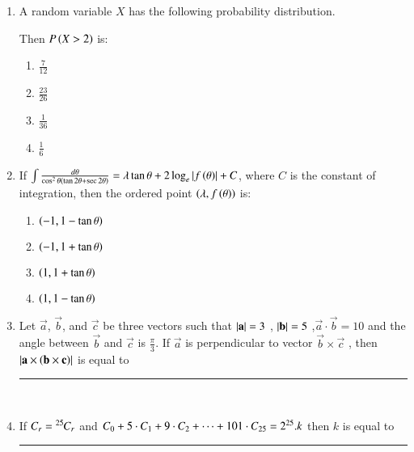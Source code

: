 \documentclass[journal]{IEEEtran}
\begin{document}
\begin{enumerate}
\item A random variable $X$ has the following probability distribution.
    \begin{table}[h!]    
        \centering
        
    \end{table}
    Then $P\left(X>2\right)$ is:
    \begin{multicols}{2}
    \begin{enumerate}
        \item $\frac{7}{12}$\\
        \item $\frac{23}{26}$
        \item $\frac{1}{36}$\\
        \item $\frac{1}{6}$\\
    \end{enumerate}
    \end{multicols}

    \item If $\int \frac{d\theta}{\cos^2 \theta (\tan 2\theta + \sec 2 \theta)} = \lambda \tan \theta + 2 \log_e \left\vert f\left(\theta\right)\right\vert  + C$, where $C$ is the constant of integration, then the ordered point $\left(\lambda, f\left(\theta\right)\right)$ is:
    \begin{multicols}{2}
    \begin{enumerate}
        \item $\left(-1, 1-\tan \theta\right)$\\
        \item $\left(-1, 1+\tan \theta\right)$\\
        \item $\left(1, 1+\tan \theta\right)$\\
        \item $\left(1, 1-\tan \theta\right)$
    \end{enumerate}
    \end{multicols}

    \item Let $\Vec{a}$, $\vec{b}$, and $\vec{c}$ be three vectors such that $\left\vert\mathbf{ a}\right\vert=3$ , $\left\vert\mathbf {b}\right\vert=5$ ,$\vec{a}\cdot \vec{b}= 10$ and the angle between $\vec{b}$ and $\vec{c}$ is $\frac{\pi}{3}$. If $\vec{a}$ is perpendicular to vector $\vec{b} \times \vec{c}$ ,  then $\left\vert\mathbf{a} \times \left(\mathbf{b}\times \mathbf{c}\right)\right\vert$ is equal to \rule{1cm}{0.15mm}\\

   \item If ${{}^{}\mkern-1muC_{r}} = {{}^{25}\mkern-1muC_{r}}$ and ${{}^{}\mkern-1muC_{0}}+ 5 \cdot {{}^{}\mkern-1muC_{1}}+ 9 \cdot {{}^{}\mkern-1muC_{2}}+ \dots + 101 \cdot {{}^{}\mkern-1muC_{25}} = 2^{25}. k $ then $k$ is equal to \rule{1cm}{0.15mm}\\



\end{enumerate}
\end{document}
